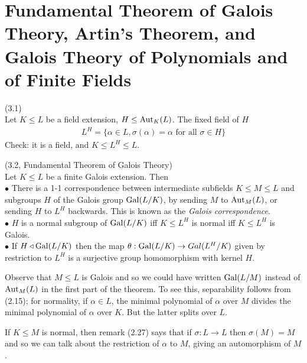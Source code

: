 \documentclass[a4paper]{article}
\begin{document}
\newpage

\section{Fundamental Theorem of Galois Theory, Artin's Theorem, and Galois Theory of Polynomials and of Finite Fields}

\begin{defi} (3.1)\\
Let $K \leq L$ be a field extension, $H \leq \operatorname{Aut}_K(L)$. The fixed field of $H$ 
\begin{equation*}
\begin{aligned}
L^H = \{\alpha \in L, \sigma(\alpha) = \alpha \text{ for all } \sigma \in H\}
\end{aligned}
\end{equation*}
Check: it is a field, and $K \leq L^H \leq L$.
\end{defi}

\begin{defi} (3.2, Fundamental Theorem of Galois Theory)\\
Let $K \leq L$ be a finite Galois extension. Then\\
$\bullet$ There is a 1-1 correspondence between intermediate subfields $K \leq M \leq L$ and subgroups $H$ of the Galois group $\operatorname{Gal}(L/K)$, by sending $M$ to $\operatorname{Aut}_M(L)$, or sending $H$ to $L^H$ backwards. This is known as the \emph{Galois correspondence}.\\
$\bullet$ $H$ is a normal subgroup of $\operatorname{Gal}(L / K)$ iff $K \leq L^H$ is normal iff $K \leq L^H$ is Galois.\\
$\bullet$ If $H \triangleleft \operatorname{Gal}(L/K)$ then the map $\theta:\operatorname{Gal}(L/K) \to Gal(L^H /K)$ given by restriction to $L^H$ is a surjective group homomorphism with kernel $H$.
\end{defi}

\begin{rem}
Observe that $M \leq L$ is Galois and so we could have written $\operatorname{Gal}(L/M)$ instead of $\operatorname{Aut}_M(L)$ in the first part of the theorem. To see this, separability follows from (2.15); for normality, if $\alpha \in L$, the minimal polynomial of $\alpha$ over $M$ divides the minimal polynomial of $\alpha$ over $K$. But the latter splits over $L$.

If $K \leq M$ is normal, then remark (2.27) says that if $\sigma:L \to L$ then $\sigma(M) = M$ and so we can talk about the restriction of $\alpha$ to $M$, giving an automorphism of $M$.
\end{rem}
\end{document}
